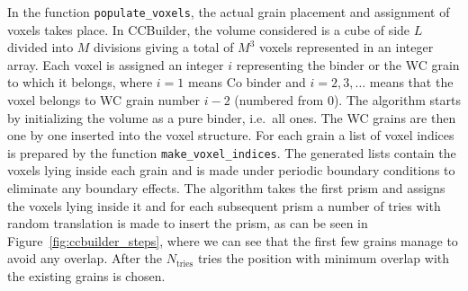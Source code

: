 \documentclass[3p,12pt]{elsarticle}
\begin{document}
In the function \verb|populate_voxels|, the actual grain placement and assignment of voxels takes place.
In CCBuilder, the volume considered is a cube of side $L$ divided into $M$ divisions giving a total of $M^3$ voxels represented in an integer array.
%
Each voxel is assigned an integer $i$ representing the binder or the WC grain to which it belongs, where $i=1$ means Co binder and $i = 2, 3, \ldots$ means that the voxel belongs to WC grain number $i-2$ (numbered from $0$).
The algorithm starts by initializing the volume as a pure binder, i.e.\ all ones.
The WC grains are then one by one inserted into the voxel structure.
For each grain a list of voxel indices is prepared by the function \verb|make_voxel_indices|.
The generated lists contain the voxels lying inside each grain and is made under periodic boundary conditions to eliminate any boundary effects.
%
The algorithm takes the first prism and assigns the voxels lying inside it and for each subsequent prism a number of tries with random translation is made to insert the prism, as can be seen in Figure~\ref{fig:ccbuilder_steps}, where we can see that the first few grains manage to avoid any overlap.
After the $N_\text{tries}$ tries the position with minimum overlap with the existing grains is chosen.

\end{document}
